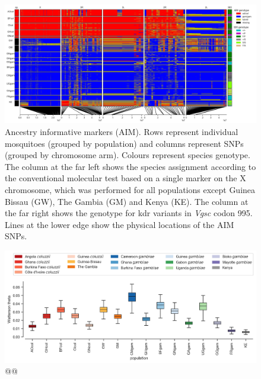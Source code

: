 \documentclass[a4paper,11pt,abstracton,hidelinks]{scrartcl}
\begin{document}
\begin{figure}[H]
	\begin{center}
		\includegraphics*[width=6.3in]{artwork/AIM_figure_scaled.jpg}
	\end{center}
	\caption{Ancestry informative markers (AIM). Rows represent individual mosquitoes (grouped by population) and columns represent SNPs (grouped by chromosome arm). Colours represent species genotype. The column at the far left shows the species assignment according to the conventional molecular test based on a single marker on the X chromosome, which was performed for all populations except Guinea Bissau (GW), The Gambia (GM) and Kenya (KE). The column at the far right shows the genotype for kdr variants in \textit{Vgsc} codon 995. Lines at the lower edge show the physical locations of the AIM SNPs.}
	\label{aim}
\end{figure}



\clearpage


\begin{figure}[H]
	\begin{center}
		\includegraphics*[width=6.3in]{artwork/Watterson_theta.jpeg}
	\end{center}
	\caption{@@}
	\label{div}
\end{figure}

\clearpage
\end{document}
